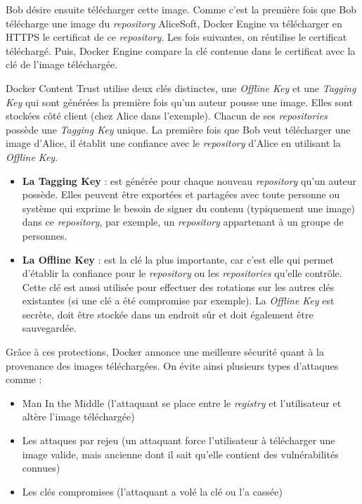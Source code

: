 \documentclass[11pt,a4paper,oneside]{report}
\begin{document}
Bob désire ensuite télécharger cette image. Comme c'est la première fois que Bob télécharge une image du \textit{repository} AliceSoft, Docker Engine va télécharger en HTTPS le certificat de ce \textit{repository}. Les fois suivantes, on réutilise le certificat téléchargé. Puis, Docker Engine compare la clé contenue dans le certificat avec la clé de l'image téléchargée.

Docker Content Trust utilise deux clés distinctes, une \textit{Offline Key} et une \textit{Tagging Key} qui sont générées la première fois qu'un auteur pousse une image. Elles sont stockées côté client (chez Alice dans l'exemple). Chacun de ses \textit{repositories} possède une \textit{Tagging Key} unique. La première fois que Bob veut télécharger une image d'Alice, il établit une confiance avec le \textit{repository} d'Alice en utilisant la \textit{Offline Key}.

\begin{itemize}
\item \textbf{La Tagging Key} : est générée pour chaque nouveau \textit{repository} qu'un auteur possède. Elles peuvent être exportées et partagées avec toute personne ou système qui exprime le besoin de signer du contenu (typiquement une image) dans ce \textit{repository}, par exemple, un \textit{repository} appartenant à un groupe de personnes.
\item \textbf{La Offline Key} : est la clé la plus importante, car c'est elle qui permet d'établir la confiance pour le \textit{repository} ou les \textit{repositories} qu'elle contrôle. Cette clé est aussi utilisée pour effectuer des rotations sur les autres clés existantes (si une clé a été compromise par exemple). La \textit{Offline Key} est secrète, doit être stockée dans un endroit sûr et doit également être sauvegardée.
\end{itemize}


Grâce à ces protections, Docker annonce une meilleure sécurité quant à la provenance des images téléchargées. On évite ainsi plusieurs types d'attaques comme :
\begin{itemize}
\item Man In the Middle (l'attaquant se place entre le \textit{registry} et l'utilisateur et altère l'image téléchargée)
\item Les attaques par rejeu (un attaquant force l'utilisateur à télécharger une image valide, mais ancienne dont il sait qu'elle contient des vulnérabilités connues)
\item Les clés compromises (l'attaquant a volé la clé ou l'a cassée)
\end{itemize}
\end{document}
